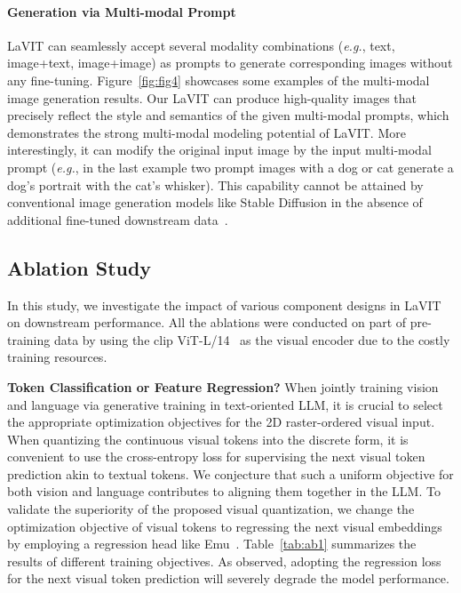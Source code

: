 \vspace{-0.1in}

\paragraph{Generation via Multi-modal Prompt} LaVIT can seamlessly accept several modality combinations (\emph{e.g.}, text, image+text, image+image) as prompts to generate corresponding images without any fine-tuning. Figure~\ref{fig:fig4} showcases some examples of the multi-modal image generation results. Our LaVIT can produce high-quality images that precisely reflect the style and semantics of the given multi-modal prompts, which demonstrates the strong multi-modal modeling potential of LaVIT. More interestingly, it can modify the original input image by the input multi-modal prompt (\emph{e.g.}, in the last example two prompt images with a dog or cat generate a dog's portrait with the cat's whisker). This capability cannot be attained by conventional image generation models like Stable Diffusion in the absence of additional fine-tuned downstream data~\citep{ruiz2023dreambooth}. 

\subsection{Ablation Study}
In this study, we investigate the impact of various component designs in LaVIT on downstream performance. All the ablations were conducted on part of pre-training data by using the clip ViT-L/14~\citep{jia2021scaling} as the visual encoder due to the costly training resources.

\textbf{Token Classification or Feature Regression?} 
When jointly training vision and language via generative training in text-oriented LLM, it is crucial to select the appropriate optimization objectives for the 2D raster-ordered visual input. When quantizing the continuous visual tokens into the discrete form, it is convenient to use the cross-entropy loss for supervising the next visual token prediction akin to textual tokens. We conjecture that such a uniform objective for both vision and language contributes to aligning them together in the LLM. To validate the superiority of the proposed visual quantization, we change the optimization objective of visual tokens to regressing the next visual embeddings by employing a regression head like Emu~\citep{sun2023generative}. Table~\ref{tab:ab1} summarizes the results of different training objectives. As observed, adopting the regression loss for the next visual token prediction will severely degrade the model performance.

